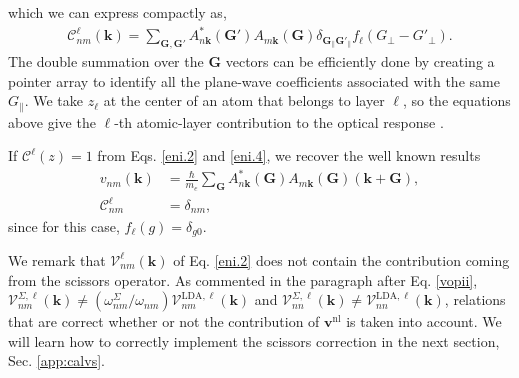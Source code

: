which we can express compactly as,
\begin{align}\label{eni.4}
\mathcal{C}^{\ell}_{nm}(\mathbf{k})=
\sum_{\mathbf{G},\mathbf{G}'} A^*_{n\mathbf{k}}(\mathbf{G}')  A_{m\mathbf{k}}(\mathbf{G})
\delta_{\mathbf{G}_\parallel \mathbf{G}'_\parallel} 
f_{\ell}(G_\perp-G'_\perp)
.
\end{align}  
The double summation over the $\mathbf{G}$ vectors can be efficiently done by
creating a pointer array to identify all the plane-wave coefficients associated
with the same $G_{\parallel}$. We take $z_{\ell}$ at the center of an atom that
belongs to layer $\ell$, so the equations above give the $\ell$-th atomic-layer
contribution to the optical response \cite{mendozaPRB06}.

If $\mathcal{C}^{\ell}(z) = 1$ from Eqs. \eqref{eni.2} and \eqref{eni.4}, we
recover the well known results
\begin{align}\label{eni.21}
v_{nm}(\mathbf{k})
&= \frac{\hbar}{m_{e}}\sum_{\mathbf{G}}
A^*_{n\mathbf{k}}(\mathbf{G})A_{m\mathbf{k}}(\mathbf{G})(\mathbf{k}+\mathbf{G}),
\nonumber\\
\mathcal{C}^{\ell}_{nm} &= \delta_{nm},
\end{align}  
since for this case, $f_{\ell}(g) = \delta_{g0}$.

We remark that $\boldsymbol{\mathcal{V}}^{\ell}_{nm}(\mathbf{k})$ of Eq.
\eqref{eni.2} does not contain the contribution coming from the scissors
operator. As commented in the paragraph after Eq. \eqref{vopii},
$\boldsymbol{\mathcal{V}}^{\Sigma,\ell}_{nm}(\mathbf{k})\ne
(\omega^{\Sigma}_{nm}/\omega_{nm})
\boldsymbol{\mathcal{V}}^{\mathrm{LDA},\ell}_{nm}(\mathbf{k})$ and
$\boldsymbol{\mathcal{V}}^{\Sigma,\ell}_{nn}(\mathbf{k})\ne
\boldsymbol{\mathcal{V}}^{\mathrm{LDA},\ell}_{nn}(\mathbf{k})$, relations that
are correct whether or not the contribution of $\mathbf{v}^\mathrm{nl}$ is taken
into account. We will learn how to correctly implement the scissors correction
in the next section, Sec. \ref{app:calvs}.



